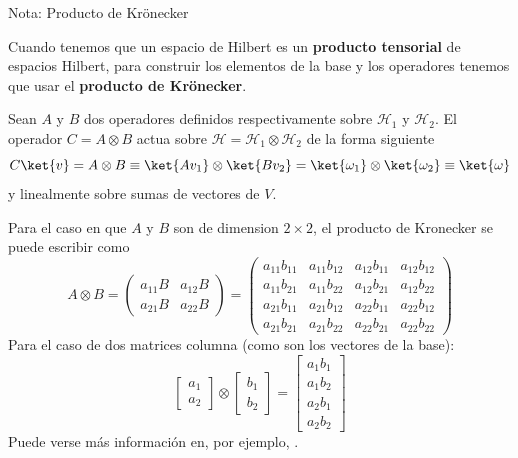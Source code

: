 \documentclass[a4paper,11pt]{book} %
\numberwithin{equation}{chapter}
\def\lp{\left(}
\def\rp{\right)}
\begin{document}
	\begin{mybox_blue}{Nota: Producto de Krönecker}
	
	Cuando tenemos que un espacio de Hilbert es un \textbf{producto tensorial} de espacios Hilbert, para construir los
	elementos de la base y los operadores tenemos que usar el \textbf{producto de Krönecker}. 
	
	Sean $A$ y $B$ dos operadores definidos respectivamente sobre $\mathcal{H}_1$ y $\mathcal{H}_2$. El operador 
	$C=A \otimes B$ actua sobre $\mathcal{H} = \mathcal{H}_1 \otimes \mathcal{H}_2$ de la forma siguiente
	\begin{equation} \label{ec_multiqubit_C=AxB_1}
	C \ket{v} = A \otimes B \equiv \ket{Av_1} \otimes \ket{Bv_2} = \ket{\omega_1} \otimes \ket{\omega_2} \equiv \ket{\omega}
	\end{equation}
	y linealmente sobre sumas de vectores de $V$. 
	
	Para el caso en que $A$ y $B$ son de dimension $2\times 2$, el producto de Kronecker se puede escribir como
	\begin{equation}
	A \otimes B = \lp \begin{matrix}
	a_{11} B & a_{12} B \\
	a_{21} B & a_{22} B
	\end{matrix}	 \rp = 
	\lp \begin{matrix}
	a_{11} b_{11} & a_{11} b_{12} & a_{12} b_{11} & a_{12}b_{12} \\
	a_{11} b_{21} & a_{11} b_{22} & a_{12} b_{21} & a_{12}b_{22} \\
	a_{21} b_{11} & a_{21} b_{12} & a_{22} b_{11} & a_{22}b_{12} \\
	a_{21} b_{21} & a_{21} b_{22} & a_{22} b_{21} & a_{22}b_{22} 
	\end{matrix} \rp
	\end{equation}
	Para el caso de dos matrices columna (como son los vectores de la base):
	\begin{equation}	
	\begin{bmatrix} a_1 \\ a_2 \end{bmatrix} \otimes \begin{bmatrix} b_1 \\ b_2 \end{bmatrix} = 
	\begin{bmatrix} a_1 b_1 \\ a_1 b_2 \\ a_2 b_1 \\ a_2 b_2	\end{bmatrix}
	\end{equation}
	Puede verse más información en, por ejemplo, \cite{wiki_kronecker}.
	\end{mybox_blue}
\end{document}
